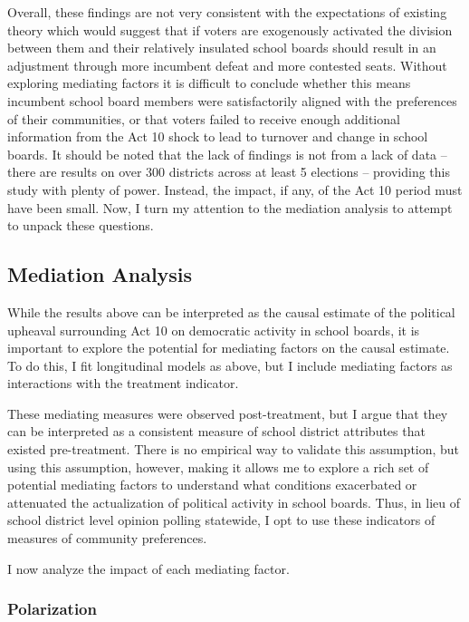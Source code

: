 Overall, these findings are not very consistent with the expectations of 
existing theory which would suggest that if voters are exogenously activated 
the division between them and their relatively insulated school boards should 
result in an adjustment through more incumbent defeat and more contested seats. 
Without exploring mediating factors it is difficult to conclude whether this means 
incumbent school board members were satisfactorily aligned with the preferences 
of their communities, or that voters failed to receive enough additional information 
from the Act 10 shock to lead to turnover and change in school boards. It should 
be noted that the lack of findings is not from a lack of data -- there are 
results on over 300 districts across at least 5 elections -- providing this study 
with plenty of power. Instead, the impact, if any, of the Act 10 period must have 
been small. Now, I 
turn my attention to the mediation analysis to attempt to unpack these questions. 


\subsection{Mediation Analysis}

While the results above can be interpreted as the causal estimate of the political 
upheaval surrounding Act 10 on democratic activity in school boards, it is important 
to explore the potential for mediating 
factors on the causal estimate. To do this, I fit longitudinal models as above, 
but I include mediating factors as interactions with the treatment indicator. 

These mediating measures were observed post-treatment, but I argue that they 
can be interpreted as a consistent measure of school district attributes that 
existed pre-treatment. There is no empirical way to validate this assumption, but 
using this assumption, however, making it allows me to explore a rich set of potential mediating 
factors to understand what conditions exacerbated or attenuated the actualization 
of political activity in school boards. Thus, in lieu of school district level 
opinion polling statewide, I opt to use these indicators of measures of community 
preferences. 

I now analyze the impact of each mediating factor. 

\subsubsection{Polarization}

